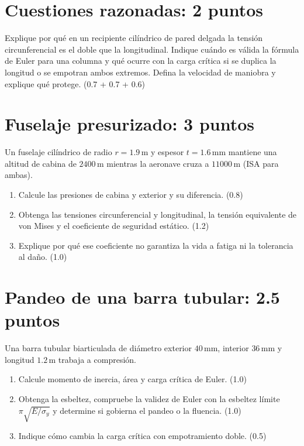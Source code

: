 \section{Cuestiones razonadas: 2 puntos}
Explique por qué en un recipiente cilíndrico de pared delgada la tensión circunferencial es el doble que la longitudinal. Indique cuándo es válida la fórmula de Euler para una columna y qué ocurre con la carga crítica si se duplica la longitud o se empotran ambos extremos. Defina la velocidad de maniobra y explique qué protege. (0.7 + 0.7 + 0.6)
\section{Fuselaje presurizado: 3 puntos}
Un fuselaje cilíndrico de radio $r=1.9\,\mathrm m$ y espesor $t=1.6\,\mathrm{mm}$ mantiene una altitud de cabina de $2400\,\mathrm m$ mientras la aeronave cruza a $11000\,\mathrm m$ (ISA para ambas).
\begin{enumerate}[label=\alph*)]
\item Calcule las presiones de cabina y exterior y su diferencia. (0.8)
\item Obtenga las tensiones circunferencial y longitudinal, la tensión equivalente de von Mises y el coeficiente de seguridad estático. (1.2)
\item Explique por qué ese coeficiente no garantiza la vida a fatiga ni la tolerancia al daño. (1.0)
\end{enumerate}
\section{Pandeo de una barra tubular: 2.5 puntos}
Una barra tubular biarticulada de diámetro exterior $40\,\mathrm{mm}$, interior $36\,\mathrm{mm}$ y longitud $1.2\,\mathrm m$ trabaja a compresión.
\begin{enumerate}[label=\alph*)]
\item Calcule momento de inercia, área y carga crítica de Euler. (1.0)
\item Obtenga la esbeltez, compruebe la validez de Euler con la esbeltez límite $\pi\sqrt{E/\sigma_y}$ y determine si gobierna el pandeo o la fluencia. (1.0)
\item Indique cómo cambia la carga crítica con empotramiento doble. (0.5)
\end{enumerate}
